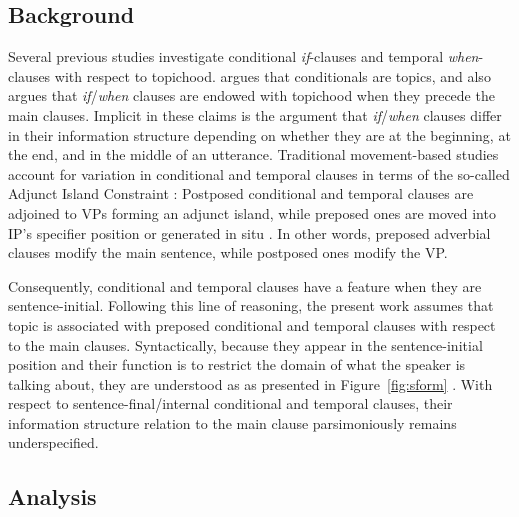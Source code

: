 \subsection{Background} 
\label{10:ssec:adjunct:background}



Several previous studies investigate conditional \textit{if}-clauses
and temporal \textit{when}-clauses with respect to topichood.
\citet{haiman:78} argues that conditionals are topics, and
\citet{ramsay:87} also argues that \textit{if}/\textit{when} clauses
are endowed with topichood when they precede the main clauses.
Implicit in these claims is the argument that
\textit{if}/\textit{when} clauses differ in their information
structure depending on whether they are at the beginning, at the end,
and in the middle of an utterance.  Traditional movement-based studies
account for variation in conditional and temporal clauses in terms of
the so-called Adjunct Island Constraint \citep{huang:82}:
Postposed conditional and temporal clauses are adjoined to VPs forming
an adjunct island, while preposed ones are moved into IP's specifier
position \citep{iatridou:91} or generated in situ
\citep{taylor:07}.  In other words, preposed adverbial clauses modify
the main sentence, while postposed ones modify the VP.



Consequently, conditional and temporal clauses have a  feature
when they are sentence-initial.  Following this line of reasoning, the
present work assumes that topic is associated with preposed
conditional and temporal clauses with respect to the main
clauses. Syntactically, because they appear in the sentence-initial
position and their function is to restrict the domain of what the
speaker is talking about, they are understood as 
as presented in
Figure~\ref{fig:sform} . With
respect to sentence-final/internal conditional and temporal clauses,
their information structure relation to the main clause parsimoniously
remains underspecified.



\subsection{Analysis}
\label{10:ssec:adjunct:analysis}


